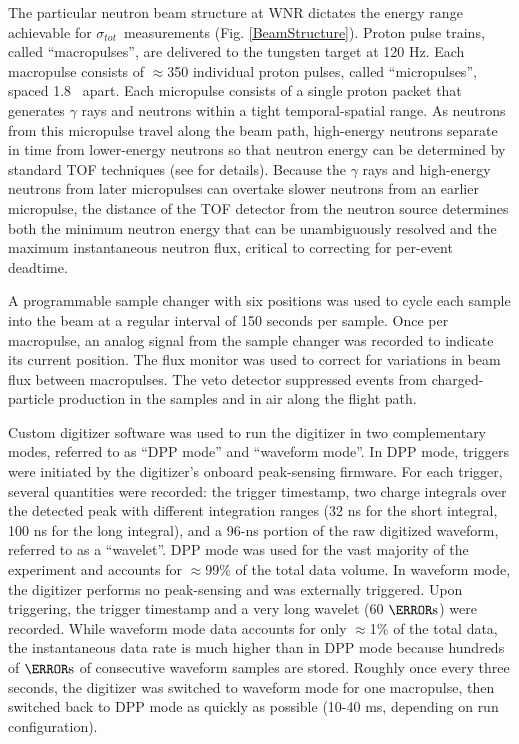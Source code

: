 \documentclass[twocolumn,secnumarabic,amssymb, nobibnotes, aps, prl,
superscriptaddress, nobalancelastpage, floatfix]{revtex4}
\newcommand{\tot}{\ensuremath{\sigma_{tot}}}
\begin{document}
The particular neutron beam structure at WNR dictates the energy range
achievable for \tot\ measurements (Fig. \ref{BeamStructure}).
Proton pulse trains, called ``macropulses'', are delivered to the tungsten target at 120 Hz.
Each macropulse consists of $\approx$350 individual proton pulses, called
``micropulses'', spaced 1.8 
\micro\second\ apart. Each micropulse consists of a single proton packet
that generates $\gamma$ rays and neutrons within a tight
temporal-spatial range. As neutrons from this micropulse travel along the beam path, 
high-energy neutrons separate in time from lower-energy neutrons so that neutron
energy can be determined by standard TOF techniques (see \cite{Moore1980} for details).
Because the $\gamma$ rays and high-energy neutrons from later micropulses can
overtake slower neutrons from an earlier micropulse, the distance of the TOF
detector from the neutron source determines both the minimum neutron energy that can be 
unambiguously resolved and the maximum instantaneous neutron flux, critical to correcting
for per-event deadtime.

A programmable sample changer with six positions
was used to cycle each sample into the beam at a regular interval of 150 seconds 
per sample. Once per macropulse, an analog signal from the sample changer
was recorded to indicate its current position.
The flux monitor was used to correct for variations in beam flux between 
macropulses. The veto detector suppressed events from charged-particle production 
in the samples and in air along the flight path.

Custom digitizer software was used to run the 
digitizer in two complementary modes, referred to as ``DPP mode'' and ``waveform 
mode''. In DPP mode, triggers were initiated by the digitizer's onboard
peak-sensing firmware. For each trigger, several quantities were recorded: the trigger 
timestamp, two charge integrals over the detected peak with different
integration ranges (32 ns for the short integral, 100 ns for the long integral),
and a 96-ns portion of the raw digitized waveform, referred to as a ``wavelet''.
DPP mode was used for the vast majority of the 
experiment and accounts for $\approx$99\% of the total data volume. In waveform mode, 
the digitizer performs no peak-sensing and was externally triggered. Upon 
triggering, the trigger timestamp and a very long wavelet (60 $\micro\second$) 
were recorded. While waveform mode data accounts for only $\approx$1\% of the total data, 
the instantaneous data rate is much higher than in DPP 
mode because hundreds of $\micro\second$ of consecutive waveform samples are 
stored. Roughly once every three seconds, the digitizer was switched to 
waveform mode for one macropulse, then switched back to DPP mode as quickly as
possible (10-40 ms, depending on run configuration).  
\end{document}

